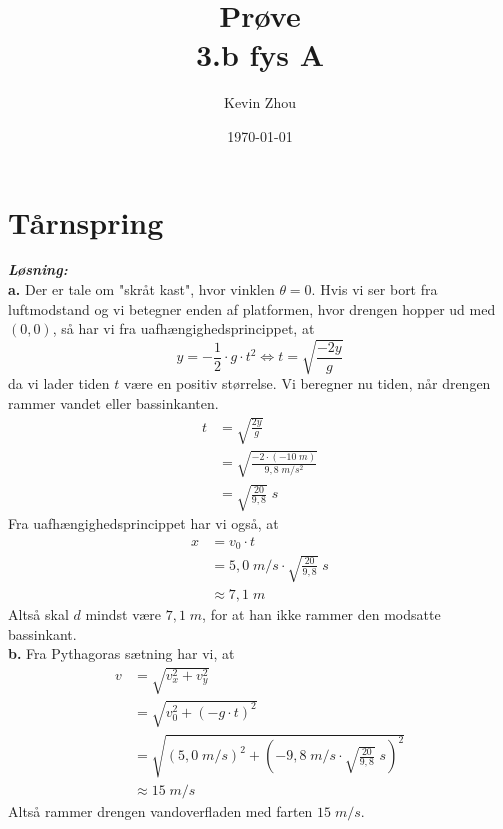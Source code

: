 \documentclass{report}
\title{Prøve\\
{\Large \textbf{3.b fys A}}}
\author{Kevin Zhou}
\date{\today}
\newcommand{\sol}{\setlength{\parindent}{0cm}\textbf{\textit{Løsning:}}\setlength{\parindent}{1cm}}
\begin{document}
\maketitle
\section*{Tårnspring}
\sol \\
\textbf{a.}
Der er tale om "skråt kast", hvor vinklen $\theta=0$.
Hvis vi ser bort fra luftmodstand og vi betegner enden af platformen, hvor drengen hopper ud med $(0,0)$, så har vi fra uafhængighedsprincippet, at 
\[
y=-\frac{1}{2}\cdot g \cdot t^2 \iff t=\sqrt{\frac{-2y}{g}} 
\] 
da vi lader tiden $t$ være en positiv størrelse. 
Vi beregner nu tiden, når drengen rammer vandet eller bassinkanten.
\begin{equation*}
\begin{split}
  t&=\sqrt{\frac{2y}{g}} \\
  &=\sqrt{\frac{-2 \cdot \left(-10 \;\unit{m} \right) }{9,8 \;\unit{m/s^2} }} \\
  &=\sqrt{\frac{20}{9,8}}  \;\unit{s} 
\end{split}
\end{equation*}
Fra uafhængighedsprincippet har vi også, at 
\begin{equation*}
\begin{split}
  x&=v_0 \cdot t\\
  &=5,0 \;\unit{m/s} \cdot \sqrt{\frac{20}{9,8}}  \;\unit{s} \\
  &\approx 7,1 \;\unit{m} 
\end{split}
\end{equation*}
Altså skal $d$ mindst være $7,1 \;\unit{m} $, for at han ikke rammer den modsatte bassinkant. \\[1ex]
\textbf{b.}
Fra Pythagoras sætning har vi, at 
\begin{equation*}
\begin{split}
  v&=\sqrt{v_x^2 + v_y^2} \\
  &=\sqrt{v_0^2+\left(-g \cdot t\right)^2 } \\
  &=\sqrt{\left(5,0 \;\unit{m/s} \right)^2 + \left(-9,8 \;\unit{m/s} \cdot \sqrt{\frac{20}{9,8}}\;\unit{s} \right) ^2} \\
  &\approx 15 \;\unit{m/s} 
\end{split}
\end{equation*}
Altså rammer drengen vandoverfladen med farten $15 \;\unit{m/s} $.
\end{document}
